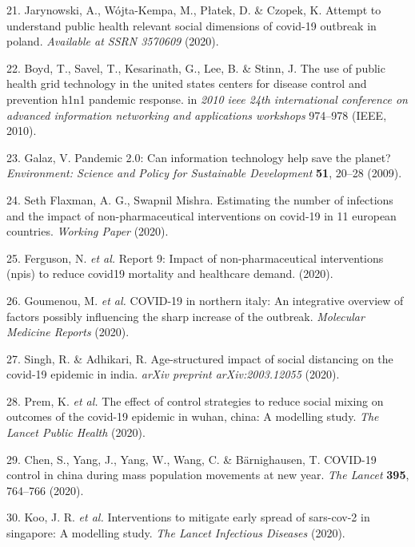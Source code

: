 \documentclass[]{article}
\begin{document}
\begin{cslreferences}
\leavevmode\hypertarget{ref-jarynowski2020attempt}{}%
21. Jarynowski, A., Wójta-Kempa, M., Płatek, D. \& Czopek, K. Attempt to understand public health relevant social dimensions of covid-19 outbreak in poland. \emph{Available at SSRN 3570609} (2020).

\leavevmode\hypertarget{ref-boyd2010use}{}%
22. Boyd, T., Savel, T., Kesarinath, G., Lee, B. \& Stinn, J. The use of public health grid technology in the united states centers for disease control and prevention h1n1 pandemic response. in \emph{2010 ieee 24th international conference on advanced information networking and applications workshops} 974--978 (IEEE, 2010).

\leavevmode\hypertarget{ref-galaz2009pandemic}{}%
23. Galaz, V. Pandemic 2.0: Can information technology help save the planet? \emph{Environment: Science and Policy for Sustainable Development} \textbf{51}, 20--28 (2009).

\leavevmode\hypertarget{ref-flaxman2020}{}%
24. Seth Flaxman, A. G., Swapnil Mishra. Estimating the number of infections and the impact of non-pharmaceutical interventions on covid-19 in 11 european countries. \emph{Working Paper} (2020).

\leavevmode\hypertarget{ref-ferguson2020report}{}%
25. Ferguson, N. \emph{et al.} Report 9: Impact of non-pharmaceutical interventions (npis) to reduce covid19 mortality and healthcare demand. (2020).

\leavevmode\hypertarget{ref-goumenou2020covid}{}%
26. Goumenou, M. \emph{et al.} COVID-19 in northern italy: An integrative overview of factors possibly influencing the sharp increase of the outbreak. \emph{Molecular Medicine Reports} (2020).

\leavevmode\hypertarget{ref-singh2020age}{}%
27. Singh, R. \& Adhikari, R. Age-structured impact of social distancing on the covid-19 epidemic in india. \emph{arXiv preprint arXiv:2003.12055} (2020).

\leavevmode\hypertarget{ref-prem2020effect}{}%
28. Prem, K. \emph{et al.} The effect of control strategies to reduce social mixing on outcomes of the covid-19 epidemic in wuhan, china: A modelling study. \emph{The Lancet Public Health} (2020).

\leavevmode\hypertarget{ref-chen2020covid}{}%
29. Chen, S., Yang, J., Yang, W., Wang, C. \& Bärnighausen, T. COVID-19 control in china during mass population movements at new year. \emph{The Lancet} \textbf{395}, 764--766 (2020).

\leavevmode\hypertarget{ref-koo2020interventions}{}%
30. Koo, J. R. \emph{et al.} Interventions to mitigate early spread of sars-cov-2 in singapore: A modelling study. \emph{The Lancet Infectious Diseases} (2020).


\end{cslreferences}
\end{document}
